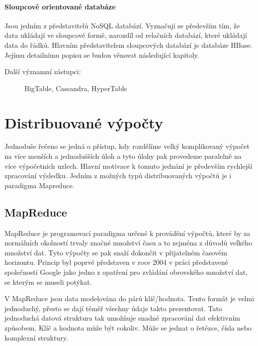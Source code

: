 \documentclass[thesis=M,czech]{FITthesis}[2012/06/26]
\begin{document}
\paragraph{Sloupcově orientované databáze}
Jsou jedním z představitelů NoSQL databází. Vyznačují se především tím, že data ukládají ve sloupcové formě, narozdíl od relačních databází, které ukládají data do řádků. Hlavním představitelem sloupcových databází je databáze HBase. Jejímu detailnímu popisu se budou věnovat následující kapitoly.
\begin{description}
	\item[Další významní zástupci: ] BigTable, Cassandra, HyperTable
\end{description}

\section{Distribuované výpočty}
Jednoduše řečeno se jedná o přístup, kdy rozdělíme velký komplikovaný výpočet na více menších a jednodušších úloh a tyto úlohy pak provedeme paralelně na více výpočetních uzlech. Hlavní motivace k tomuto jednání je především rychlejší zpracování výsledku. Jedním z možných typů distribuovaných výpočtů je i paradigma Mapreduce. 

\subsection{MapReduce}
MapReduce je programovací paradigma určené k provádění výpočtů, které by za normálních okolností trvaly značné množství času a to zejména z důvodů velkého množství dat. Tyto výpočty se pak snaží dokončit v přijatelném časovém horizontu. Princip byl poprvé představen v roce 2004 v  práci představené společností Google \cite{gmr} jako jedno z opatření pro zvládání obrovského množství dat, se kterým se museli potýkat.

V MapReduce jsou data modelována do párů klíč/hodnota. Tento formát je velmi jednoduchý, přesto se dají téměř všechny údaje takto prezentovat. Tato jednoduchá datová struktura tak umožňuje snadné zpracování dat efektivním způsobem. Klíč a hodnota může být cokoliv. Může se jednat o řetězce, čísla nebo komplexní struktury.
\end{document}
